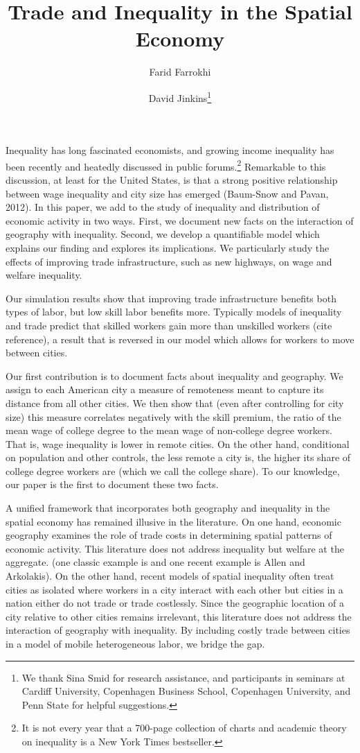 \documentclass[12 pt]{article}
\title{Trade and Inequality in the Spatial Economy}
\author[1]{Farid Farrokhi}
\author[2]{David Jinkins\thanks{We thank Sina Smid for research assistance, and participants in seminars at Cardiff University, Copenhagen Business School, Copenhagen University, and Penn State for helpful suggestions.}}
\affil[1]{Penn State}
\affil[2]{Copenhagen Business School}
\begin{document}
\maketitle

Inequality has long fascinated economists, and growing income inequality has been recently and heatedly discussed in public forums.\footnote{It is not every year that a 700-page collection of charts and academic theory on inequality is a New York Times bestseller.} Remarkable to this discussion, at least for the United States, is that a strong positive relationship between wage inequality and city size has emerged (Baum-Snow and Pavan, 2012).
In this paper, we add to the study of inequality and distribution of economic activity in two ways. First, we document new facts on the interaction of geography with inequality. Second, we develop a quantifiable model which explains our finding and explores its implications. We particularly study the effects of improving trade infrastructure, such as new highways, on wage and welfare inequality. 

Our simulation results show that improving trade infrastructure benefits both types of labor, but low skill labor benefits more.  Typically models of inequality and trade predict that skilled workers gain more than unskilled workers (cite reference), a result that is reversed in our model which allows for workers to move between cities.

Our first contribution is to document facts about inequality and geography.  We assign to each American city a measure of remoteness meant to capture its distance from all other cities.  We then show that (even after controlling for city size) this measure correlates negatively with the skill premium, the ratio of the mean wage of college degree to the mean wage of non-college degree workers. That is, wage inequality is lower in remote cities. On the other hand, conditional on population and other controls, the {less} remote a city is, the higher its share of college degree workers are (which we call the college share). To our knowledge, our paper is the first to document these two facts.

A unified framework that incorporates both geography and inequality in the spatial economy has remained illusive in the literature. On one hand, economic geography examines the role of trade costs in determining spatial patterns of economic activity. This literature does not address inequality but welfare at the aggregate. (one classic example is \citep{krugman1991increasing} and one recent example is Allen and Arkolakis). On the other hand, recent models of spatial inequality often treat cities as isolated \citep{davis2014comparative} where workers in a city interact with each other but cities in a nation either do not trade or trade costlessly. Since the geographic location of a city relative to other cities remains irrelevant, this literature does not address the interaction of geography with inequality. By including costly trade between cities in a model of mobile heterogeneous labor, we bridge the gap.
\end{document}
